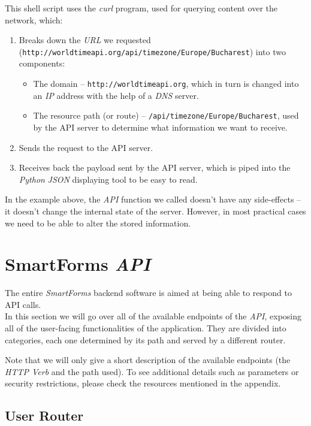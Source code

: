 \documentclass[11pt, a4paper]{report}
\def\code#1{\texttt{#1}}
\begin{document}
This shell script uses the \textit{curl} program, used for querying content over the network, which:
\begin{enumerate}
    \item Breaks down the \textit{URL} we requested (\code{http://worldtimeapi.org/api/timezone/Europe/Bucharest}) into two components:
    \begin{itemize}
        \item The domain -- \code{http://worldtimeapi.org}, which in turn is changed into an \textit{IP} address with the help of a \textit{DNS} server.
        \item The resource path (or route) -- \code{/api/timezone/Europe/Bucharest}, used by the API server to determine what information we want to receive.
    \end{itemize}
    \item Sends the request to the API server.
    \item Receives back the payload sent by the API server, which is piped into the \textit{Python} \textit{JSON} displaying tool to be easy to read.
\end{enumerate}

In the example above, the \textit{API} function we called doesn't have any side-effects -- it doesn't change the internal state of the server. However, in most practical cases we need to be able to alter the stored information.

\section{SmartForms \textit{API}}

The entire \textit{SmartForms} backend software is aimed at being able to respond to API calls.\\
In this section we will go over all of the available endpoints of the \textit{API}, exposing all of the user-facing functionalities of the application. They are divided into categories, each one determined by its path and served by a different router.

Note that we will only give a short description of the available endpoints (the \textit{HTTP Verb} and the path used). To see additional details such as parameters or security restrictions, please check the resources mentioned in the appendix.

\subsection{User Router}
\end{document}
